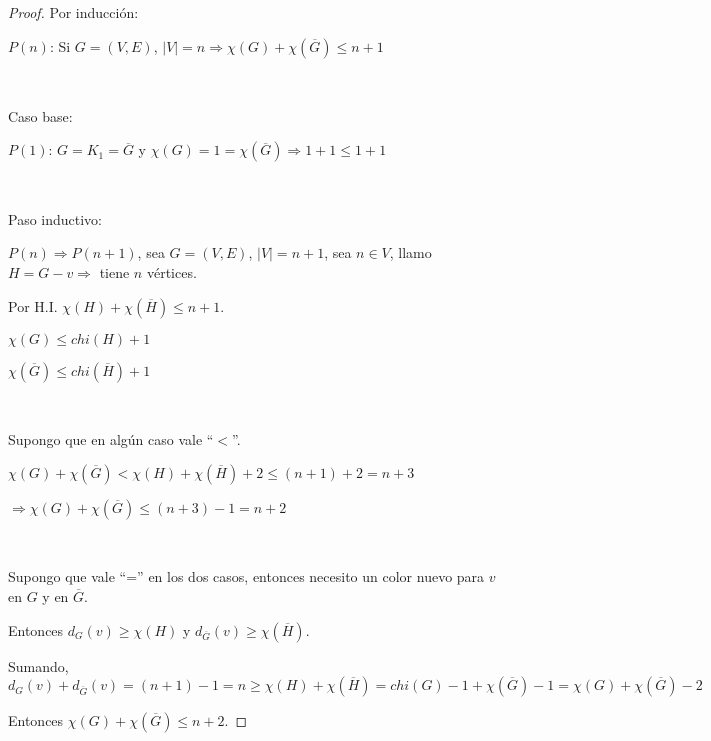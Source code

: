 \setcounter{subsection}{11}
\subsection{}
\subsubsection{}

\begin{proof}
	Por inducción:

	$P(n)$: Si $G = (V, E)$, $|V| = n \Longrightarrow \chi(G) + \chi(\overline{G}) \leq n + 1$

	~

	Caso base:

	$P(1)$: $G = K_1 = \overline{G}$ y $\chi(G) = 1 = \chi(\overline{G}) \Longrightarrow 1 + 1 \leq 1 + 1$

	~

	Paso inductivo:

	$P(n) \Longrightarrow P(n + 1)$, sea $G = (V, E)$, $|V| = n + 1$, sea $n \in V$, llamo $H = G - v \Longrightarrow$ tiene $n$ vértices.

	Por H.I. $\chi(H) + \chi(\overline{H}) \leq n + 1$.

	$\chi(G) \leq chi(H) + 1$

	$\chi(\overline{G}) \leq chi(\overline{H}) + 1$

	~

	Supongo que en algún caso vale ``$<$''.

	$\chi(G) + \chi(\overline{G}) < \chi(H) + \chi(\overline{H}) + 2 \leq (n + 1) + 2 = n + 3$

	$\Longrightarrow \chi(G) + \chi(\overline{G}) \leq (n + 3) - 1 = n + 2$

	~

	Supongo que vale ``='' en los dos casos, entonces necesito un color nuevo para $v$ en $G$ y en $\overline{G}$.

	Entonces $d_G(v) \geq \chi(H)$ y $d_{\overline{G}}(v) \geq \chi(\overline{H})$.

	Sumando, $d_G(v) + d_{\overline{G}}(v) = (n + 1) - 1 = n \geq \chi(H) + \chi(\overline{H}) = chi(G) - 1 + \chi(\overline{G}) - 1 = \chi(G) + \chi(\overline{G}) - 2$

	Entonces $\chi(G) + \chi(\overline{G}) \leq n + 2$.
\end{proof}

